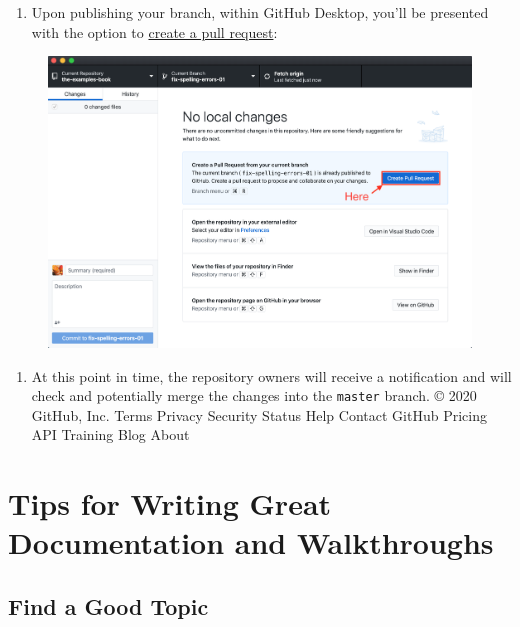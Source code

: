 \documentclass[]{book}
\providecommand{\tightlist}{%
  \setlength{\itemsep}{0pt}\setlength{\parskip}{0pt}}
\begin{document}
\begin{enumerate}
\def\labelenumi{\arabic{enumi}.}
\setcounter{enumi}{18}
\tightlist
\item
  Upon publishing your branch, within GitHub Desktop, you'll be
  presented with the option to
  \protect\hyperlink{github-desktop-pull-request}{create a pull
  request}:
\end{enumerate}

\begin{figure}
\centering
\includegraphics{./images/gh-desktop-12.png}
\caption{}
\end{figure}

\begin{enumerate}
\def\labelenumi{\arabic{enumi}.}
\setcounter{enumi}{19}
\tightlist
\item
  At this point in time, the repository owners will receive a
  notification and will check and potentially merge the changes into the
  \texttt{master} branch. © 2020 GitHub, Inc. Terms Privacy Security
  Status Help Contact GitHub Pricing API Training Blog About
\end{enumerate}

\chapter{Tips for Writing Great Documentation and
Walkthroughs}\label{tips-for-writing-great-documentation-and-walkthroughs}

\section{Find a Good Topic}\label{find-a-good-topic}
\end{document}
